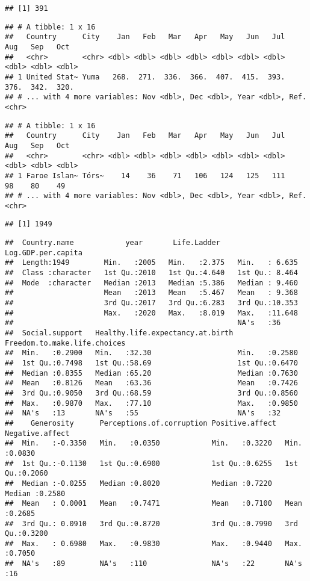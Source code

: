 \documentclass[
]{article}
\begin{document}
\begin{verbatim}
## [1] 391
\end{verbatim}

\begin{verbatim}
## # A tibble: 1 x 16
##   Country      City    Jan   Feb   Mar   Apr   May   Jun   Jul   Aug   Sep   Oct
##   <chr>        <chr> <dbl> <dbl> <dbl> <dbl> <dbl> <dbl> <dbl> <dbl> <dbl> <dbl>
## 1 United Stat~ Yuma   268.  271.  336.  366.  407.  415.  393.  376.  342.  320.
## # ... with 4 more variables: Nov <dbl>, Dec <dbl>, Year <dbl>, Ref. <chr>
\end{verbatim}

\begin{verbatim}
## # A tibble: 1 x 16
##   Country      City    Jan   Feb   Mar   Apr   May   Jun   Jul   Aug   Sep   Oct
##   <chr>        <chr> <dbl> <dbl> <dbl> <dbl> <dbl> <dbl> <dbl> <dbl> <dbl> <dbl>
## 1 Faroe Islan~ Tórs~    14    36    71   106   124   125   111    98    80    49
## # ... with 4 more variables: Nov <dbl>, Dec <dbl>, Year <dbl>, Ref. <chr>
\end{verbatim}

\begin{verbatim}
## [1] 1949
\end{verbatim}

\begin{verbatim}
##  Country.name            year       Life.Ladder    Log.GDP.per.capita
##  Length:1949        Min.   :2005   Min.   :2.375   Min.   : 6.635    
##  Class :character   1st Qu.:2010   1st Qu.:4.640   1st Qu.: 8.464    
##  Mode  :character   Median :2013   Median :5.386   Median : 9.460    
##                     Mean   :2013   Mean   :5.467   Mean   : 9.368    
##                     3rd Qu.:2017   3rd Qu.:6.283   3rd Qu.:10.353    
##                     Max.   :2020   Max.   :8.019   Max.   :11.648    
##                                                    NA's   :36        
##  Social.support   Healthy.life.expectancy.at.birth Freedom.to.make.life.choices
##  Min.   :0.2900   Min.   :32.30                    Min.   :0.2580              
##  1st Qu.:0.7498   1st Qu.:58.69                    1st Qu.:0.6470              
##  Median :0.8355   Median :65.20                    Median :0.7630              
##  Mean   :0.8126   Mean   :63.36                    Mean   :0.7426              
##  3rd Qu.:0.9050   3rd Qu.:68.59                    3rd Qu.:0.8560              
##  Max.   :0.9870   Max.   :77.10                    Max.   :0.9850              
##  NA's   :13       NA's   :55                       NA's   :32                  
##    Generosity      Perceptions.of.corruption Positive.affect  Negative.affect 
##  Min.   :-0.3350   Min.   :0.0350            Min.   :0.3220   Min.   :0.0830  
##  1st Qu.:-0.1130   1st Qu.:0.6900            1st Qu.:0.6255   1st Qu.:0.2060  
##  Median :-0.0255   Median :0.8020            Median :0.7220   Median :0.2580  
##  Mean   : 0.0001   Mean   :0.7471            Mean   :0.7100   Mean   :0.2685  
##  3rd Qu.: 0.0910   3rd Qu.:0.8720            3rd Qu.:0.7990   3rd Qu.:0.3200  
##  Max.   : 0.6980   Max.   :0.9830            Max.   :0.9440   Max.   :0.7050  
##  NA's   :89        NA's   :110               NA's   :22       NA's   :16
\end{verbatim}
\end{document}
